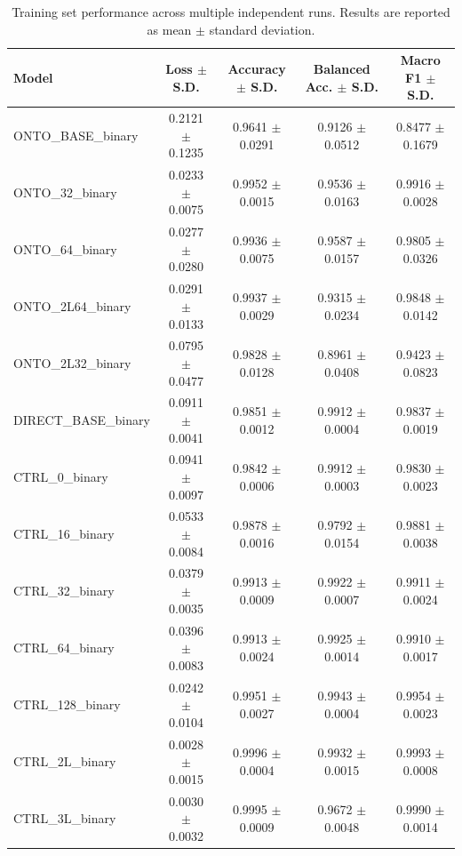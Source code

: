 \begin{table}[t]
\centering
\begin{tabular}{l c c c c}
\toprule
Model & Loss $\pm$ S.D. & Accuracy $\pm$ S.D. & Balanced Acc. $\pm$ S.D. & Macro F1 $\pm$ S.D. \\
\midrule
ONTO_BASE_binary & 0.2121 $\pm$ 0.1235 & 0.9641 $\pm$ 0.0291 & 0.9126 $\pm$ 0.0512 & 0.8477 $\pm$ 0.1679 \\
ONTO_32_binary & 0.0233 $\pm$ 0.0075 & 0.9952 $\pm$ 0.0015 & 0.9536 $\pm$ 0.0163 & 0.9916 $\pm$ 0.0028 \\
ONTO_64_binary & 0.0277 $\pm$ 0.0280 & 0.9936 $\pm$ 0.0075 & 0.9587 $\pm$ 0.0157 & 0.9805 $\pm$ 0.0326 \\
ONTO_2L64_binary & 0.0291 $\pm$ 0.0133 & 0.9937 $\pm$ 0.0029 & 0.9315 $\pm$ 0.0234 & 0.9848 $\pm$ 0.0142 \\
ONTO_2L32_binary & 0.0795 $\pm$ 0.0477 & 0.9828 $\pm$ 0.0128 & 0.8961 $\pm$ 0.0408 & 0.9423 $\pm$ 0.0823 \\
DIRECT_BASE_binary & 0.0911 $\pm$ 0.0041 & 0.9851 $\pm$ 0.0012 & 0.9912 $\pm$ 0.0004 & 0.9837 $\pm$ 0.0019 \\
CTRL_0_binary & 0.0941 $\pm$ 0.0097 & 0.9842 $\pm$ 0.0006 & 0.9912 $\pm$ 0.0003 & 0.9830 $\pm$ 0.0023 \\
CTRL_16_binary & 0.0533 $\pm$ 0.0084 & 0.9878 $\pm$ 0.0016 & 0.9792 $\pm$ 0.0154 & 0.9881 $\pm$ 0.0038 \\
CTRL_32_binary & 0.0379 $\pm$ 0.0035 & 0.9913 $\pm$ 0.0009 & 0.9922 $\pm$ 0.0007 & 0.9911 $\pm$ 0.0024 \\
CTRL_64_binary & 0.0396 $\pm$ 0.0083 & 0.9913 $\pm$ 0.0024 & 0.9925 $\pm$ 0.0014 & 0.9910 $\pm$ 0.0017 \\
CTRL_128_binary & 0.0242 $\pm$ 0.0104 & 0.9951 $\pm$ 0.0027 & 0.9943 $\pm$ 0.0004 & 0.9954 $\pm$ 0.0023 \\
CTRL_2L_binary & 0.0028 $\pm$ 0.0015 & 0.9996 $\pm$ 0.0004 & 0.9932 $\pm$ 0.0015 & 0.9993 $\pm$ 0.0008 \\
CTRL_3L_binary & 0.0030 $\pm$ 0.0032 & 0.9995 $\pm$ 0.0009 & 0.9672 $\pm$ 0.0048 & 0.9990 $\pm$ 0.0014 \\
\bottomrule
\end{tabular}
\caption{Training set performance across multiple independent runs. Results are reported as mean $\pm$ standard deviation.}
\label{tab:training_rn_results}
\end{table}